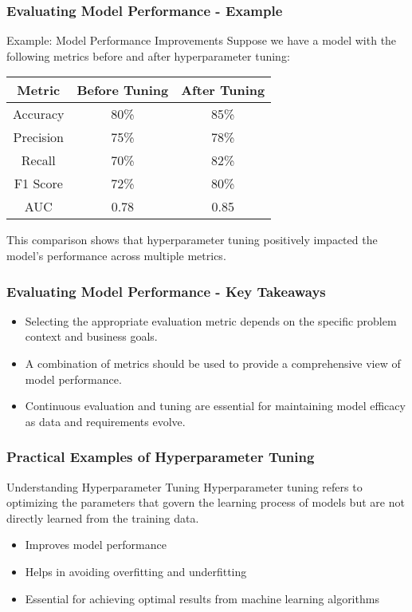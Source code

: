 \documentclass[aspectratio=169]{beamer}
\begin{document}
\begin{frame}[fragile]
    \frametitle{Evaluating Model Performance - Example}
    \begin{block}{Example: Model Performance Improvements}
        Suppose we have a model with the following metrics before and after hyperparameter tuning:

        \begin{table}[h]
            \centering
            \begin{tabular}{|c|c|c|}
                \hline
                \textbf{Metric} & \textbf{Before Tuning} & \textbf{After Tuning} \\
                \hline
                Accuracy & 80\% & 85\% \\
                Precision & 75\% & 78\% \\
                Recall & 70\% & 82\% \\
                F1 Score & 72\% & 80\% \\
                AUC & 0.78 & 0.85 \\
                \hline
            \end{tabular}
        \end{table}
        
        This comparison shows that hyperparameter tuning positively impacted the model's performance across multiple metrics.
    \end{block}
\end{frame}

\begin{frame}[fragile]
    \frametitle{Evaluating Model Performance - Key Takeaways}
    \begin{itemize}
        \item Selecting the appropriate evaluation metric depends on the specific problem context and business goals.
        \item A combination of metrics should be used to provide a comprehensive view of model performance.
        \item Continuous evaluation and tuning are essential for maintaining model efficacy as data and requirements evolve.
    \end{itemize}
\end{frame}

\begin{frame}
    \frametitle{Practical Examples of Hyperparameter Tuning}
    \begin{block}{Understanding Hyperparameter Tuning}
        Hyperparameter tuning refers to optimizing the parameters that govern the learning process of models but are not directly learned from the training data. 
    \end{block}
    
    \begin{itemize}
        \item Improves model performance
        \item Helps in avoiding overfitting and underfitting
        \item Essential for achieving optimal results from machine learning algorithms
    \end{itemize}
\end{frame}
\end{document}
